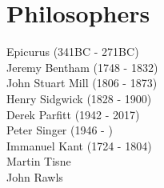 \documentclass{article}
\begin{document}
 
\section{Philosophers}
Epicurus (341BC - 271BC) 
\\Jeremy Bentham (1748 - 1832) %
\\John Stuart Mill (1806 - 1873) %
\\Henry Sidgwick (1828 - 1900) %
\\Derek Parfitt (1942 - 2017) %
\\Peter Singer (1946 - ) %
\\Immanuel Kant (1724 - 1804) %
\\Martin Tisne
\\John Rawls %
\end{document}
